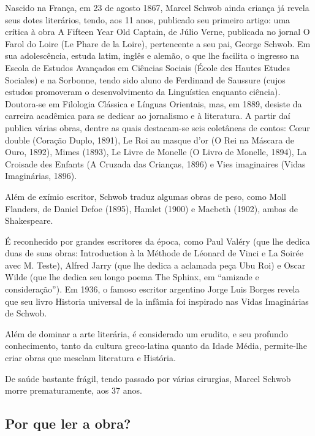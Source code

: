 \documentclass[12pt]{extarticle}
\begin{document}
Nascido na França, em 23 de agosto 1867, Marcel Schwob ainda criança já revela
seus dotes literários, tendo, aos 11 anos, publicado seu primeiro
artigo: uma crítica à obra A Fifteen Year Old Captain, de Júlio Verne,
publicada no jornal O Farol do Loire (Le Phare de la Loire), pertencente
a seu pai, George Schwob. Em sua adolescência, estuda latim, inglês e
alemão, o que lhe facilita o ingresso na Escola de Estudos Avançados em
Ciências Sociais (École des Hautes Etudes Sociales) e na Sorbonne, tendo
sido aluno de Ferdinand de Saussure (cujos estudos promoveram o
desenvolvimento da Linguística enquanto ciência). Doutora-se em
Filologia Clássica e Línguas Orientais, mas, em 1889, desiste da
carreira acadêmica para se dedicar ao jornalismo e à literatura. A
partir daí publica várias obras, dentre as quais destacam-se seis
coletâneas de contos: Cœur double (Coração Duplo, 1891), Le Roi au
masque d'or (O Rei na Máscara de Ouro, 1892), Mimes (1893), Le Livre de
Monelle (O Livro de Monelle, 1894), La Croisade des Enfants (A Cruzada
das Crianças, 1896) e Vies imaginaires (Vidas Imaginárias, 1896).




Além de exímio escritor, Schwob traduz algumas obras de peso, como Moll
Flanders, de Daniel Defoe (1895), Hamlet (1900) e Macbeth (1902), ambas
de Shakespeare.

É reconhecido por grandes escritores da época, como Paul Valéry (que lhe
dedica duas de suas obras: Introduction à la Méthode de Léonard de Vinci
e La Soirée avec M. Teste), Alfred Jarry (que lhe dedica a aclamada peça
Ubu Roi) e Oscar Wilde (que lhe dedica seu longo poema The Sphinx, em
``amizade e consideração''). Em 1936, o famoso escritor argentino Jorge
Luis Borges revela que seu livro Historia universal de la infâmia foi
inspirado nas Vidas Imaginárias de Schwob.




Além de dominar a arte literária, é considerado um erudito, e seu
profundo conhecimento, tanto da cultura greco-latina quanto da Idade
Média, permite-lhe criar obras que mesclam literatura e História.

De saúde bastante frágil, tendo passado por várias cirurgias, Marcel
Schwob morre prematuramente, aos 37 anos.

\subsection{Por que ler a obra?}
\end{document}
